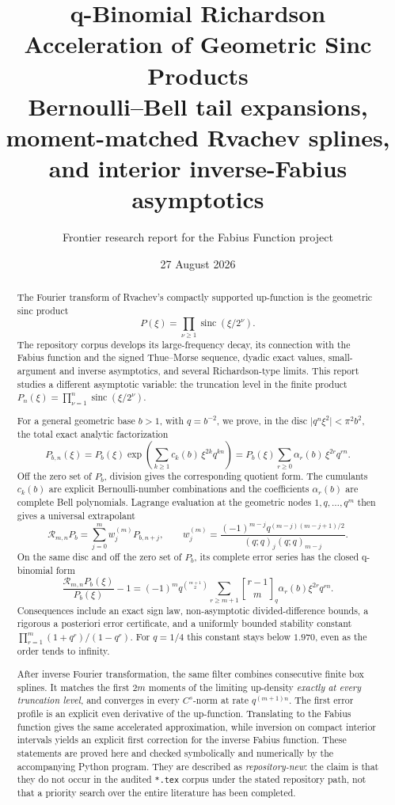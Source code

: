 \documentclass[11pt]{article}
\title{\bfseries q-Binomial Richardson Acceleration of Geometric Sinc Products\\[2mm]
\large Bernoulli--Bell tail expansions, moment-matched Rvachev splines,\\
and interior inverse-Fabius asymptotics}
\author{Frontier research report for the \repo{} Fabius Function project}
\date{27 August 2026}
\theoremstyle{definition}
\theoremstyle{remark}
\newcommand{\sinc}{\operatorname{sinc}}
\newcommand{\qbinom}[2]{\genfrac{[}{]}{0pt}{}{#1}{#2}_{q}}
\begin{document}
\maketitle

\begin{abstract}
The Fourier transform of Rvachev's compactly supported up-function is the geometric
sinc product
\[
   P(\xi)=\prod_{\nu\geq 1}\sinc(\xi/2^\nu).
\]
The repository corpus develops its large-frequency decay, its connection with the
Fabius function and the signed Thue--Morse sequence, dyadic exact values,
small-argument and inverse asymptotics, and several Richardson-type limits.
This report studies a different asymptotic variable: the truncation level in the
finite product
\(P_n(\xi)=\prod_{\nu=1}^n\sinc(\xi/2^\nu)\).

For a general geometric base \(b>1\), with \(q=b^{-2}\), we prove, in the
disc \(\lvert q^n\xi^2\rvert<\pi^2b^2\), the total exact analytic factorization
\[
 P_{b,n}(\xi)
 =P_b(\xi)\exp\!\left(\sum_{k\geq1}c_k(b)\,\xi^{2k}q^{kn}\right)
 =P_b(\xi)\sum_{r\geq0}\alpha_r(b)\,\xi^{2r}q^{rn}.
\]
Off the zero set of \(P_b\), division gives the corresponding quotient form.
The cumulants \(c_k(b)\) are explicit Bernoulli-number combinations and the
coefficients \(\alpha_r(b)\) are complete Bell polynomials. Lagrange evaluation
at the geometric nodes \(1,q,\ldots,q^m\) then gives a universal extrapolant
\[
 \mathcal R_{m,n}P_b=\sum_{j=0}^m w_j^{(m)}P_{b,n+j},
 \qquad
 w_j^{(m)}=\frac{(-1)^{m-j}q^{(m-j)(m-j+1)/2}}
 {(q;q)_j(q;q)_{m-j}}.
\]
On the same disc and off the zero set of \(P_b\), its complete error series has
the closed q-binomial form
\[
 \frac{\mathcal R_{m,n}P_b(\xi)}{P_b(\xi)}-1
 =(-1)^m q^{\binom{m+1}{2}}
 \sum_{r\geq m+1}\qbinom{r-1}{m}\alpha_r(b)\xi^{2r}q^{rn}.
\]
Consequences include an exact sign law, non-asymptotic divided-difference bounds,
a rigorous a posteriori error certificate, and a uniformly bounded stability
constant \(\prod_{r=1}^m(1+q^r)/(1-q^r)\). For \(q=1/4\) this constant stays
below \(1.970\), even as the order tends to infinity.

After inverse Fourier transformation, the same filter combines consecutive finite
box splines. It matches the first \(2m\) moments of the limiting up-density
\emph{exactly at every truncation level}, and converges in every \(C^s\)-norm at
rate \(q^{(m+1)n}\). The first error profile is an explicit even derivative of
the up-function. Translating to the Fabius function gives the same accelerated
approximation, while inversion on compact interior intervals yields an explicit
first correction for the inverse Fabius function. These statements are proved
here and checked symbolically and numerically by the accompanying Python program.
They are described as \emph{repository-new}: the claim is that they do not occur
in the audited \texttt{*.tex} corpus under the stated repository path, not that a
priority search over the entire literature has been completed.
\end{abstract}
\end{document}
